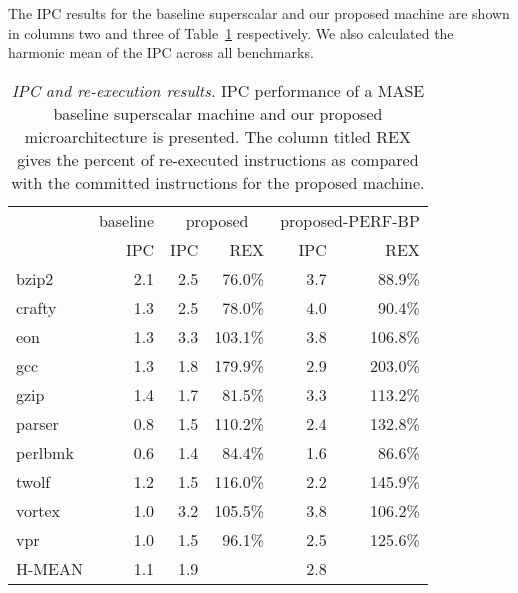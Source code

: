 \documentclass[10pt,dvips]{article}
\begin{document}
The IPC results for the baseline superscalar and our proposed
machine are shown in columns two and three of Table~\ref{tab:results}
respectively.
We also calculated the harmonic mean of the IPC
across all benchmarks.
%
\begin{table}[p]
\begin{center}
\caption{{\em IPC and re-execution results.}
IPC performance of a MASE baseline superscalar machine and our
proposed microarchitecture is presented.
The column titled REX gives the percent of 
re-executed instructions as compared with the committed instructions
for the proposed machine.}
\label{tab:results}
\vspace{+0.1in}
\scriptsize {
\begin{tabular}{|l||r|r|r|r|r|}
\hline
 & baseline &
 \multicolumn{2}{c|}{proposed} &
 \multicolumn{2}{c|}{proposed-PERF-BP} \\
\cline{2-6}
 & IPC & IPC & REX & IPC & REX \\

\hline
bzip2&
2.1 & 2.5 & 76.0\% & 3.7 & 88.9\% \\

\hline
crafty&
1.3 & 2.5 & 78.0\% & 4.0 & 90.4\% \\

\hline
eon&
1.3 & 3.3 & 103.1\% & 3.8 & 106.8\% \\

\hline
gcc&
1.3 & 1.8 & 179.9\% & 2.9 & 203.0\% \\

\hline
gzip&
1.4 & 1.7 & 81.5\% & 3.3 & 113.2\% \\

\hline
parser&
0.8 & 1.5 & 110.2\% & 2.4 & 132.8\% \\

\hline
perlbmk&
0.6 & 1.4 & 84.4\% & 1.6 & 86.6\% \\

\hline
twolf&
1.2 & 1.5 & 116.0\% & 2.2 & 145.9\% \\

\hline
vortex&
1.0 & 3.2 & 105.5\% & 3.8 & 106.2\% \\

\hline
vpr&
1.0 & 1.5 & 96.1\% & 2.5 & 125.6\% \\

\hline
H-MEAN&
1.1 & 1.9 & & 2.8 & \\

\hline
\end{tabular}
}
\end{center}
\end{table}
\end{document}
